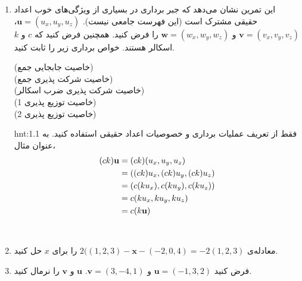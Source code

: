 {\begin{spacing}{1.5}
\begin{enumerate}[label=\textbf{\arabic*}.]
            \item {این تمرین نشان می‌دهد که جبر برداری در بسیاری از ویژگی‌های خوب اعداد حقیقی مشترک است (این فهرست جامعی نیست).
                $\textbf{u}=(u_{x},u_{y},u_{z})$، $\textbf{v}=(v_{x},v_{y},v_{z})$ و $\textbf{w}=(w_{x},w_{y},w_{z})$ را فرض کنید. همچنین فرض کنید که $c$ و $k$ اسکالر هستند. خواص برداری زیر را ثابت کنید.}
            \begin{flushleft}
            (خاصیت جابجایی جمع)
                 \\
                (خاصیت شرکت پذیری جمع)  \\
                (خاصیت شرکت پذیری ضرب اسکالر)  \\
                (خاصیت توزیع پذیری 1)  \\
                (خاصیت توزیع پذیری 2) 
            \end{flushleft}
            \begin{hint}{hnt:1.1}
                \Large
                فقط از تعریف عملیات برداری و خصوصیات اعداد حقیقی استفاده کنید.
                به عنوان مثال،
                \begin{equation*}
                    \centering
                    \begin{split}
                    (ck)
                        \textbf{u}&=(ck)(u_x,u_y,u_z)\\
                        &=((ck)u_x,(ck)u_y,(ck)u_z)\\
                        &=(c(ku_x),c(ku_y),c(ku_z))\\
                        &=c(ku_x,ku_y,ku_z)\\
                        &=c(k\textbf{u})
                    \end{split}
                \end{equation*}
            \end{hint} \\

            \item {معادله‌ی $2((1,2,3)-\textbf{x}-(-2,0,4)=-2(1,2,3)$ را برای $x$ حل کنید.}

            \item {فرض کنید $\textbf{u}=(-1,3,2)$ و $\textbf{v}=(3,-4,1)$. $\textbf{u}$ و $\textbf{v}$ را نرمال کنید.}


\end{enumerate}
\end{spacing}}
